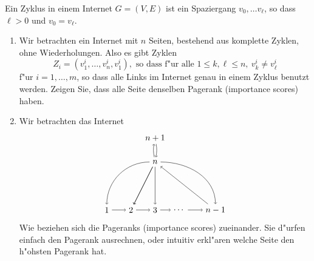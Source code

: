 \documentclass[a4,11pt]{article}
\begin{document}
\begin{aufgabe}
  Ein Zyklus in einem Internet $G = (V, E)$ ist ein Spaziergang $v_0, \dots v_\ell$, so dass $\ell > 0$ und $v_0 = v_\ell$. 
  
  \begin{enumerate}
  \item
  Wir betrachten ein Internet mit $n$ Seiten, bestehend aus komplette Zyklen, ohne Wiederholungen. Also es gibt Zyklen
  \[
  Z_i = (v^i_1, \dots , v^i_n, v^i_1), \text{ so dass f"ur alle } 1 \leq k, \ell \leq n, \ v^i_k \neq v^i_\ell
  \]
  f"ur $i = 1, \dots , m$, so dass alle Links im Internet genau in einem Zyklus benutzt werden. Zeigen Sie, dass alle Seite denselben Pagerank (importance scores) haben.
  \item
  Wir betrachten das Internet
  \[
 \begin{tikzpicture}
 \node (1) at (1,0) {$1$};
  \node (2) at (2,0) {$2$};
  \node (3) at (3,0) {$3$};
  \node (4) at (4,0) {$\cdots$};
  \node (5) at (5.5,0) {$n -1$};
  \node (n) at (3,2) {$n$};
  \node (nn) at (3,3) {$n + 1$};
\draw[->] (1)--(2);
\draw[->] (2)--(3);
\draw[->] (3)--(4);
\draw[->] (4)--(5);
\draw[->] (n) [out=180, in=90] to (1);
\draw[->] (n)--(2);
\draw[->] (n)--(2);
\draw[->] (n)--(3);
\draw[->] (5)--(n);
\draw[->] (n) [out=0, in=90] to (5);
\draw[->] (n.100) [out=100, in=260] to (nn.260);
\draw[->] (nn.280) [out=280, in=80] to (n.80);
 \end{tikzpicture}
 \]
  Wie beziehen sich die Pageranks (importance scores) zueinander. Sie d"urfen einfach den Pagerank ausrechnen, oder intuitiv erkl"aren welche Seite den h"ohsten Pagerank hat.
  \end{enumerate}
\end{aufgabe}
\end{document}
